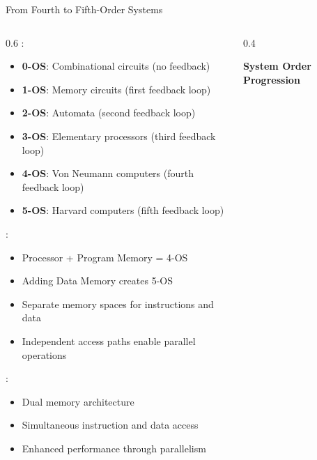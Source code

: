 \begin{frame}{From Fourth to Fifth-Order Systems}
\begin{columns}
\begin{column}{0.6\textwidth}
:
\begin{itemize}
\item \textbf{0-OS}: Combinational circuits (no feedback)
\item \textbf{1-OS}: Memory circuits (first feedback loop)
\item \textbf{2-OS}: Automata (second feedback loop)
\item \textbf{3-OS}: Elementary processors (third feedback loop)
\item \textbf{4-OS}: Von Neumann computers (fourth feedback loop)
\item \textbf{5-OS}: Harvard computers (fifth feedback loop)
\end{itemize}

\vspace{0.3cm}
:
\begin{itemize}
\item Processor + Program Memory = 4-OS
\item Adding Data Memory creates 5-OS
\item Separate memory spaces for instructions and data
\item Independent access paths enable parallel operations
\end{itemize}

\vspace{0.3cm}
:
\begin{itemize}
\item Dual memory architecture
\item Simultaneous instruction and data access
\item Enhanced performance through parallelism
\end{itemize}
\end{column}
\begin{column}{0.4\textwidth}
\begin{center}
\textbf{System Order Progression}
\vspace{0.3cm}

\end{center}
\end{column}
\end{columns}
\end{frame}

